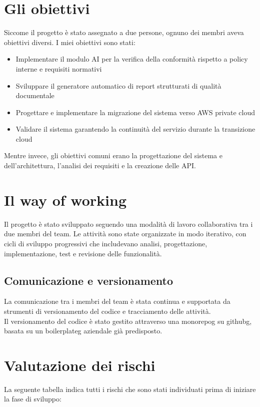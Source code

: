 \section{Gli obiettivi}
Siccome il progetto è stato assegnato a due persone, ognuno dei membri aveva obiettivi diversi. I miei obiettivi sono stati:
\begin{itemize}
    \item Implementare il modulo AI per la verifica della conformità rispetto a policy interne e requisiti normativi
    \item Sviluppare il generatore automatico di report strutturati di qualità documentale
    \item Progettare e implementare la migrazione del sistema verso AWS private cloud
    \item Validare il sistema garantendo la continuità del servizio durante la transizione cloud
\end{itemize}
Mentre invece, gli obiettivi comuni erano la progettazione del sistema e dell'architettura, l'analisi dei requisiti e la creazione delle API.

\section{Il way of working}
Il progetto è stato sviluppato seguendo una modalità di lavoro collaborativa tra i due membri del team. Le attività sono state organizzate in modo iterativo, con cicli di sviluppo progressivi che includevano analisi, progettazione, implementazione, test e revisione delle funzionalità.\\
\subsection{Comunicazione e versionamento}
La comunicazione tra i membri del team è stata continua e supportata da strumenti di versionamento del codice e tracciamento delle attività. \\
Il versionamento del codice è stato gestito attraverso una \gls{monorepog} su \gls{githubg}, basata su un \gls{boilerplateg} aziendale già predisposto. 
\section{Valutazione dei rischi}
La seguente tabella indica tutti i rischi che sono stati individuati prima di iniziare la fase di sviluppo:


